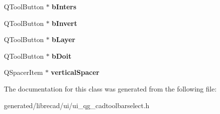 \begin{DoxyCompactItemize}
\item 
\hypertarget{classUi__QG__CadToolBarSelect_af2fcfb828051c9a253949f7a38e8d3fa}{Q\-Tool\-Button $\ast$ {\bfseries b\-Inters}}\label{classUi__QG__CadToolBarSelect_af2fcfb828051c9a253949f7a38e8d3fa}

\item 
\hypertarget{classUi__QG__CadToolBarSelect_ac66bd6f10d25d1c25e34481c27cfdd95}{Q\-Tool\-Button $\ast$ {\bfseries b\-Invert}}\label{classUi__QG__CadToolBarSelect_ac66bd6f10d25d1c25e34481c27cfdd95}

\item 
\hypertarget{classUi__QG__CadToolBarSelect_a09a1c46f80ff64c3958ab6346d6cc8ac}{Q\-Tool\-Button $\ast$ {\bfseries b\-Layer}}\label{classUi__QG__CadToolBarSelect_a09a1c46f80ff64c3958ab6346d6cc8ac}

\item 
\hypertarget{classUi__QG__CadToolBarSelect_a1123bef647e99c6d028b9ea0f75e1ee5}{Q\-Tool\-Button $\ast$ {\bfseries b\-Doit}}\label{classUi__QG__CadToolBarSelect_a1123bef647e99c6d028b9ea0f75e1ee5}

\item 
\hypertarget{classUi__QG__CadToolBarSelect_ad2a6ce3a169d959649c4868386a65572}{Q\-Spacer\-Item $\ast$ {\bfseries vertical\-Spacer}}\label{classUi__QG__CadToolBarSelect_ad2a6ce3a169d959649c4868386a65572}

\end{DoxyCompactItemize}


The documentation for this class was generated from the following file\-:\begin{DoxyCompactItemize}
\item 
generated/librecad/ui/ui\-\_\-qg\-\_\-cadtoolbarselect.\-h\end{DoxyCompactItemize}

